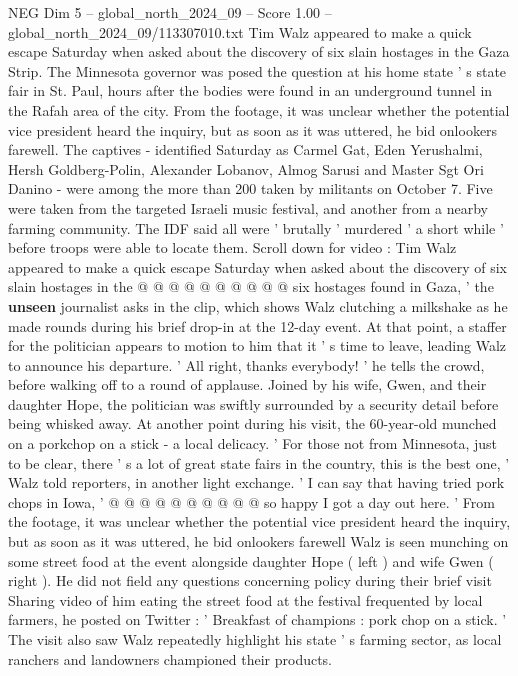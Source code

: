 \begin{textsample}{NEG Dim 5 – global\_north\_2024\_09 – Score 1.00 – global\_north\_2024\_09/113307010.txt}  \label{ex:f5_neg_148}
Tim Walz appeared to make a quick escape Saturday when asked about the discovery of six slain hostages in the Gaza Strip.
The Minnesota governor was posed the question at his home state ' s state fair in St.
Paul, hours after the bodies were found in an underground tunnel in the Rafah area of the city.
From the footage, it was unclear whether the potential vice president heard the inquiry, but as soon as it was uttered, he bid onlookers farewell.
The captives - identified Saturday as Carmel Gat, Eden Yerushalmi, Hersh Goldberg-Polin, Alexander Lobanov, Almog Sarusi and Master Sgt Ori Danino - were among the more than 200 taken by militants on October 7.
Five were taken from the targeted Israeli music festival, and another from a nearby farming community.
The IDF said all were ' brutally ' murdered ' a short while ' before troops were able to locate them.
Scroll down for video : Tim Walz appeared to make a quick escape Saturday when asked about the discovery of six slain hostages in the @ @ @ @ @ @ @ @ @ @ six hostages found in Gaza, ' the \textbf{unseen} journalist asks in the clip, which shows Walz clutching a milkshake as he made rounds during his brief drop-in at the 12-day event.
At that point, a staffer for the politician appears to motion to him that it ' s time to leave, leading Walz to announce his departure. ' All right, thanks everybody! ' he tells the crowd, before walking off to a round of applause.
Joined by his wife, Gwen, and their daughter Hope, the politician was swiftly surrounded by a security detail before being whisked away.
At another point during his visit, the 60-year-old munched on a porkchop on a stick - a local delicacy. ' For those not from Minnesota, just to be clear, there ' s a lot of great state fairs in the country, this is the best one, ' Walz told reporters, in another light exchange. ' I can say that having tried pork chops in Iowa, ' @ @ @ @ @ @ @ @ @ @ so happy I got a day out here. ' From the footage, it was unclear whether the potential vice president heard the inquiry, but as soon as it was uttered, he bid onlookers farewell Walz is seen munching on some street food at the event alongside daughter Hope ( left ) and wife Gwen ( right ).
He did not field any questions concerning policy during their brief visit Sharing video of him eating the street food at the festival frequented by local farmers, he posted on Twitter : ' Breakfast of champions : pork chop on a stick. ' The visit also saw Walz repeatedly highlight his state ' s farming sector, as local ranchers and landowners championed their products.

\end{textsample}

